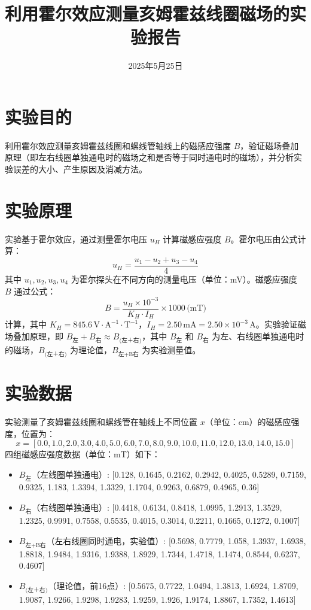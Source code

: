 \documentclass[12pt]{article}
\begin{document}
\begin{CJK}{UTF8}{gbsn}

\title{利用霍尔效应测量亥姆霍兹线圈磁场的实验报告}
\author{}
\date{2025年5月25日}
\maketitle

\section{实验目的}
利用霍尔效应测量亥姆霍兹线圈和螺线管轴线上的磁感应强度 \( B \)，验证磁场叠加原理（即左右线圈单独通电时的磁场之和是否等于同时通电时的磁场），并分析实验误差的大小、产生原因及消减方法。

\section{实验原理}
实验基于霍尔效应，通过测量霍尔电压 \( u_H \) 计算磁感应强度 \( B \)。霍尔电压由公式计算：
\[
u_H = \frac{u_1 - u_2 + u_3 - u_4}{4}
\]
其中 \( u_1, u_2, u_3, u_4 \) 为霍尔探头在不同方向的测量电压（单位：mV）。磁感应强度 \( B \) 通过公式：
\[
B = \frac{u_H \times 10^{-3}}{K_H \cdot I_H} \times 1000 \, \text{(mT)}
\]
计算，其中 \( K_H = 845.6 \, \text{V} \cdot \text{A}^{-1} \cdot \text{T}^{-1} \)，\( I_H = 2.50 \, \text{mA} = 2.50 \times 10^{-3} \, \text{A} \)。实验验证磁场叠加原理，即 \( B_{\text{左}} + B_{\text{右}} \approx B_{\text{(左＋右)}} \)，其中 \( B_{\text{左}} \) 和 \( B_{\text{右}} \) 为左、右线圈单独通电时的磁场，\( B_{\text{(左＋右)}} \) 为理论值，\( B_{\text{左+B右}} \) 为实验测量值。

\section{实验数据}
实验测量了亥姆霍兹线圈和螺线管在轴线上不同位置 \( x \)（单位：cm）的磁感应强度，位置为：
\[
x = [0.0, 1.0, 2.0, 3.0, 4.0, 5.0, 6.0, 7.0, 8.0, 9.0, 10.0, 11.0, 12.0, 13.0, 14.0, 15.0]
\]
四组磁感应强度数据（单位：mT）如下：
\begin{itemize}
    \item \( B_{\text{左}} \)（左线圈单独通电）: [0.128, 0.1645, 0.2162, 0.2942, 0.4025, 0.5289, 0.7159, 0.9325, 1.183, 1.3394, 1.3329, 1.1704, 0.9263, 0.6879, 0.4965, 0.36]
    \item \( B_{\text{右}} \)（右线圈单独通电）: [0.4418, 0.6134, 0.8418, 1.0995, 1.2913, 1.3529, 1.2325, 0.9991, 0.7558, 0.5535, 0.4015, 0.3014, 0.2211, 0.1665, 0.1272, 0.1007]
    \item \( B_{\text{左+B右}} \)（左右线圈同时通电，实验值）: [0.5698, 0.7779, 1.058, 1.3937, 1.6938, 1.8818, 1.9484, 1.9316, 1.9388, 1.8929, 1.7344, 1.4718, 1.1474, 0.8544, 0.6237, 0.4607]
    \item \( B_{\text{(左＋右)}} \)（理论值，前16点）: [0.5675, 0.7722, 1.0494, 1.3813, 1.6924, 1.8709, 1.9087, 1.9266, 1.9298, 1.9283, 1.9259, 1.926, 1.9174, 1.8867, 1.7352, 1.4613]
\end{itemize}


\end{CJK}
\end{document}
